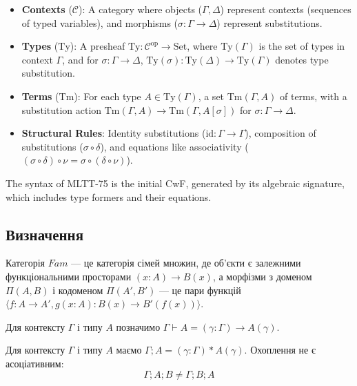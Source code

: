 \documentclass{article}
\begin{document}
\begin{itemize}
    \item \textbf{Contexts} (\(\mathcal{C}\)): A category where objects (\(\Gamma, \Delta\)) represent contexts (sequences of typed variables), and morphisms (\(\sigma : \Gamma \to \Delta\)) represent substitutions.
    \item \textbf{Types} (\(\mathrm{Ty}\)): A presheaf \(\mathrm{Ty} : \mathcal{C}^{\mathrm{op}} \to \mathrm{Set}\), where \(\mathrm{Ty}(\Gamma)\) is the set of types in context \(\Gamma\), and for \(\sigma : \Gamma \to \Delta\), \(\mathrm{Ty}(\sigma) : \mathrm{Ty}(\Delta) \to \mathrm{Ty}(\Gamma)\) denotes type substitution.
    \item \textbf{Terms} (\(\mathrm{Tm}\)): For each type \(A \in \mathrm{Ty}(\Gamma)\), a set \(\mathrm{Tm}(\Gamma, A)\) of terms, with a substitution action \(\mathrm{Tm}(\Gamma, A) \to \mathrm{Tm}(\Gamma, A[\sigma])\) for \(\sigma : \Gamma \to \Delta\).
    \item \textbf{Structural Rules}: Identity substitutions (\(\mathrm{id} : \Gamma \to \Gamma\)), composition of substitutions (\(\sigma \circ \delta\)), and equations like associativity (\((\sigma \circ \delta) \circ \nu = \sigma \circ (\delta \circ \nu)\)).
\end{itemize}

The syntax of MLTT-75 is the initial CwF, generated by its algebraic signature, which includes type formers and their equations.

\subsection{Визначення}

\begin{definition}[Fam]
Категорія $Fam$ --- це категорія сімей множин, де об’єкти є залежними функціональними просторами $(x:A)\rightarrow B(x)$, а морфізми з доменом $\Pi(A,B)$ і кодоменом $\Pi(A',B')$ --- це пари функцій $\langle f:A\rightarrow A', g(x:A):B(x)\rightarrow B'(f(x)) \rangle$.
\end{definition}

\begin{definition}[$\Pi$-похідність]
Для контексту $\Gamma$ і типу $A$ позначимо $\Gamma\vdash A = (\gamma:\Gamma)\rightarrow A(\gamma)$.
\end{definition}

\begin{definition}
Для контексту $\Gamma$ і типу $A$ маємо $\Gamma;A = (\gamma:\Gamma)*A(\gamma)$. Охоплення не є асоціативним:
\[
    \Gamma;A;B \neq \Gamma;B;A
\]
\end{definition}
\end{document}
